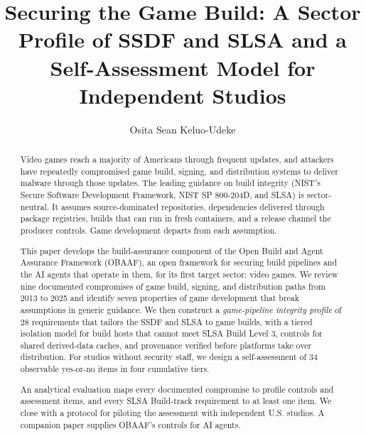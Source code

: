 \documentclass[acmsmall,screen,review]{acmart}
\begin{document}
\title[Securing the Game Build]{Securing the Game Build: A Sector Profile of SSDF and SLSA and a Self-Assessment Model for Independent Studios}

\author{Osita Sean Keluo-Udeke}

\renewcommand{\shortauthors}{Keluo-Udeke}

\begin{abstract}
Video games reach a majority of Americans through frequent updates, and attackers have repeatedly compromised game build, signing, and distribution systems to deliver malware through those updates. The leading guidance on build integrity (NIST's Secure Software Development Framework, NIST SP 800-204D, and SLSA) is sector-neutral. It assumes source-dominated repositories, dependencies delivered through package registries, builds that can run in fresh containers, and a release channel the producer controls. Game development departs from each assumption.

This paper develops the build-assurance component of the Open Build and Agent Assurance Framework (OBAAF), an open framework for securing build pipelines and the AI agents that operate in them, for its first target sector: video games. We review nine documented compromises of game build, signing, and distribution paths from 2013 to 2025 and identify seven properties of game development that break assumptions in generic guidance. We then construct a \emph{game-pipeline integrity profile} of 28 requirements that tailors the SSDF and SLSA to game builds, with a tiered isolation model for build hosts that cannot meet SLSA Build Level 3, controls for shared derived-data caches, and provenance verified before platforms take over distribution. For studios without security staff, we design a self-assessment of 34 observable yes-or-no items in four cumulative tiers.

An analytical evaluation maps every documented compromise to profile controls and assessment items, and every SLSA Build-track requirement to at least one item. We close with a protocol for piloting the assessment with independent U.S. studios. A companion paper supplies OBAAF's controls for AI agents.
\end{abstract}

\end{document}
